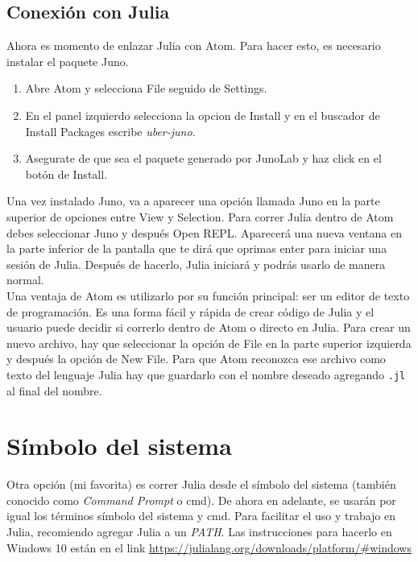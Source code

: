 \subsection{Conexión con Julia}
Ahora es momento de enlazar Julia con Atom. Para hacer esto, es necesario instalar el paquete Juno. 

\begin{enumerate}
    \item Abre Atom y selecciona \textsf{File} seguido de \textsf{Settings}. 
    \item En el panel izquierdo selecciona la opcion de \textsf{Install} y en el buscador de \textsf{Install Packages} escribe \textit{uber-juno}.
    \item Asegurate de que sea el paquete generado por JunoLab y haz click en el botón de \textsf{Install}. 
\end{enumerate}

Una vez instalado Juno, va a aparecer una opción llamada \textsf{Juno} en la parte superior de opciones entre \textsf{View} y \textsf{Selection}. Para correr Julia dentro de Atom debes seleccionar \textsf{Juno} y después \textsf{Open REPL}. Aparecerá una nueva ventana en la parte inferior de la pantalla que te dirá que oprimas enter para iniciar una sesión de Julia. Después de hacerlo, Julia iniciará y podrás usarlo de manera normal. 
\\
Una ventaja de Atom es utilizarlo por su función principal: ser un editor de texto de programación. Es una forma fácil y rápida de crear código de Julia y el usuario puede decidir si correrlo dentro de Atom o directo en Julia. Para crear un nuevo archivo, hay que seleccionar la opción de \textsf{File} en la parte superior izquierda y después la opción de \textsf{New File}. Para que Atom reconozca ese archivo como texto del lenguaje Julia hay que guardarlo con el nombre deseado agregando \texttt{.jl} al final del nombre. 



\section{Símbolo del sistema}
Otra opción (mi favorita) es correr Julia desde el símbolo del sistema (también conocido como \textit{Command Prompt} o cmd). De ahora en adelante, se usarán por igual los términos símbolo del sistema y cmd. Para facilitar el uso y trabajo en Julia, recomiendo agregar Julia a un \textit{PATH}. Las instrucciones para hacerlo en Windows 10 están en el link \url{https://julialang.org/downloads/platform/#windows}

